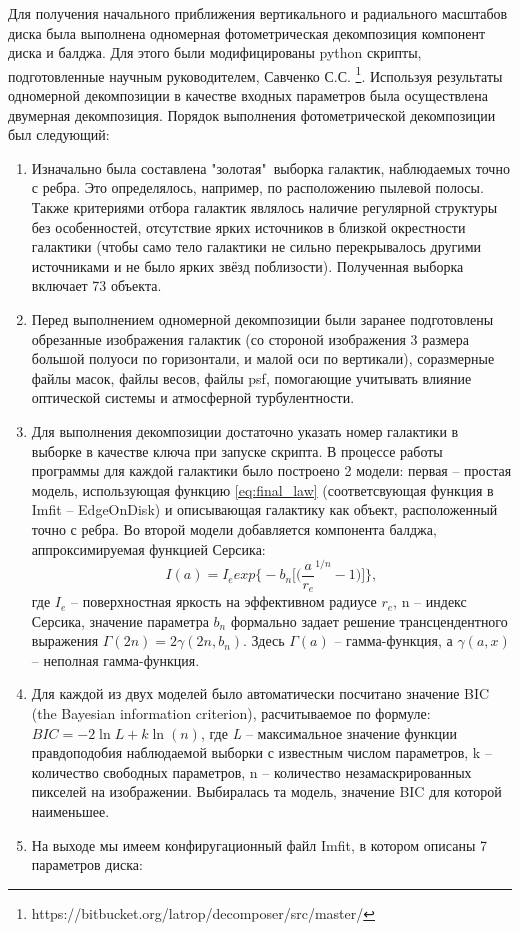 Для получения начального приближения вертикального и радиального масштабов диска была выполнена одномерная фотометрическая декомпозиция компонент диска и балджа. Для этого были модифицированы python скрипты, подготовленные научным руководителем, Савченко С.С. \footnote{https://bitbucket.org/latrop/decomposer/src/master/}. Используя результаты одномерной декомпозиции в качестве входных параметров была осуществлена двумерная декомпозиция.
Порядок выполнения фотометрической декомпозиции был следующий:
\begin{enumerate}
    \item Изначально была составлена "золотая"$\,$         выборка галактик, наблюдаемых точно с ребра. Это определялось, например, по расположению пылевой полосы. Также критериями отбора галактик являлось наличие регулярной структуры без особенностей, отсутствие ярких источников в близкой окрестности галактики (чтобы само тело галактики не сильно перекрывалось другими источниками и не было ярких звёзд поблизости). Полученная выборка включает 73 объекта.
    \item Перед выполнением одномерной декомпозиции были заранее подготовлены обрезанные изображения галактик (со стороной изображения 3 размера большой полуоси по горизонтали, и малой оси по вертикали), соразмерные файлы масок, файлы весов, файлы psf, помогающие учитывать влияние оптической системы и атмосферной турбулентности.
    \item Для выполнения декомпозиции достаточно указать номер галактики в выборке в качестве ключа при запуске скрипта. В процессе работы программы для каждой галактики было построено 2 модели: первая -- простая модель, использующая функцию \ref{eq:final_law} (соответсвующая функция в Imfit -- EdgeOnDisk) и описывающая галактику как объект, расположенный точно с ребра. Во второй модели добавляется компонента балджа, аппроксимируемая функцией Серсика:
    \begin{equation}
        I(a) = I_eexp\Bigg\{-b_n\Bigg[\bigg(\frac{a}{r_e}^{1/n}-1\bigg)\Bigg]\Bigg\},
        \label{Sersic}
    \end{equation}
    где $I_e$ -- поверхностная яркость на эффективном радиусе $r_e$,  n -- индекс Серсика, значение параметра $b_n$ формально задает решение трансцендентного выражения $\Gamma(2n) = 2\gamma(2n, b_n)$. Здесь $\Gamma(a)$ -- гамма-функция, а $\gamma(a,x)$ -- неполная гамма-функция. 
    \item Для каждой из двух моделей было автоматически посчитано значение BIC (the Bayesian information criterion), расчитываемое по формуле: $BIC = -2\ln\textit{L} + k\ln(n)$, где \textit{L} -- максимальное значение функции правдоподобия наблюдаемой выборки с известным числом параметров, k -- количество свободных параметров, n -- количество незамаскрированных пикселей на изображении. Выбиралась та модель, значение BIC для которой наименьшее. 
    \item На выходе мы имеем конфиругационный файл Imfit, в котором описаны 7 параметров диска: 
    

\end{enumerate}
